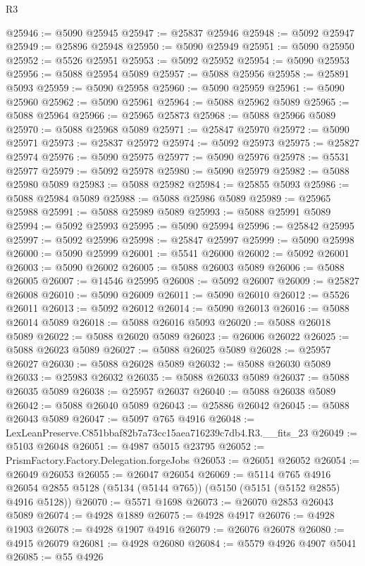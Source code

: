 \begin{lexlean}{R3}
\begin{coremodule}
@25946 := @5090 @25945
@25947 := @25837 @25946
@25948 := @5092 @25947
@25949 := @25896 @25948
@25950 := @5090 @25949
@25951 := @5090 @25950
@25952 := @5526 @25951
@25953 := @5092 @25952
@25954 := @5090 @25953
@25956 := @5088 @25954 @5089
@25957 := @5088 @25956
@25958 := @25891 @5093
@25959 := @5090 @25958
@25960 := @5090 @25959
@25961 := @5090 @25960
@25962 := @5090 @25961
@25964 := @5088 @25962 @5089
@25965 := @5088 @25964
@25966 := @25965 @25873
@25968 := @5088 @25966 @5089
@25970 := @5088 @25968 @5089
@25971 := @25847 @25970
@25972 := @5090 @25971
@25973 := @25837 @25972
@25974 := @5092 @25973
@25975 := @25827 @25974
@25976 := @5090 @25975
@25977 := @5090 @25976
@25978 := @5531 @25977
@25979 := @5092 @25978
@25980 := @5090 @25979
@25982 := @5088 @25980 @5089
@25983 := @5088 @25982
@25984 := @25855 @5093
@25986 := @5088 @25984 @5089
@25988 := @5088 @25986 @5089
@25989 := @25965 @25988
@25991 := @5088 @25989 @5089
@25993 := @5088 @25991 @5089
@25994 := @5092 @25993
@25995 := @5090 @25994
@25996 := @25842 @25995
@25997 := @5092 @25996
@25998 := @25847 @25997
@25999 := @5090 @25998
@26000 := @5090 @25999
@26001 := @5541 @26000
@26002 := @5092 @26001
@26003 := @5090 @26002
@26005 := @5088 @26003 @5089
@26006 := @5088 @26005
@26007 := @14546 @25995
@26008 := @5092 @26007
@26009 := @25827 @26008
@26010 := @5090 @26009
@26011 := @5090 @26010
@26012 := @5526 @26011
@26013 := @5092 @26012
@26014 := @5090 @26013
@26016 := @5088 @26014 @5089
@26018 := @5088 @26016 @5093
@26020 := @5088 @26018 @5089
@26022 := @5088 @26020 @5089
@26023 := @26006 @26022
@26025 := @5088 @26023 @5089
@26027 := @5088 @26025 @5089
@26028 := @25957 @26027
@26030 := @5088 @26028 @5089
@26032 := @5088 @26030 @5089
@26033 := @25983 @26032
@26035 := @5088 @26033 @5089
@26037 := @5088 @26035 @5089
@26038 := @25957 @26037
@26040 := @5088 @26038 @5089
@26042 := @5088 @26040 @5089
@26043 := @25886 @26042
@26045 := @5088 @26043 @5089
@26047 := @5097 @765 @4916
@26048 := LexLeanPreserve.C851bbaf82b7a73cc15aea716239c7db4.R3.__fits_23
@26049 := @5103 @26048
@26051 := @4987 @5015 @23795
@26052 := PrismFactory.Factory.Delegation.forgeJobs
@26053 := @26051 @26052
@26054 := @26049 @26053
@26055 := @26047 @26054
@26069 := @5114
    @765
    @4916
    @26054
    @2855
    @5128
    (@5134 (@5144 @765))
    (@5150 (@5151 (@5152 @2855) @4916 @5128))
@26070 := @5571 @1698
@26073 := @26070 @2853 @26043 @5089
@26074 := @4928 @1889
@26075 := @4928 @4917
@26076 := @4928 @1903
@26078 := @4928 @1907 @4916
@26079 := @26076 @26078
@26080 := @4915 @26079
@26081 := @4928 @26080
@26084 := @5579 @4926 @4907 @5041
@26085 := @55 @4926

\end{coremodule}
\end{lexlean}
